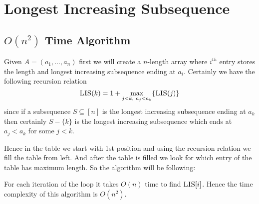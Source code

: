 \chapter{Longest Increasing Subsequence}
\begin{algoprob}
\end{algoprob}
\section{$O(n^2)$ Time Algorithm}
Given $A=(a_1,\dots, a_n)$ first we will create a $n$-length array where $i^{th}$ entry stores the length and longest increasing subsequence ending at $a_i$. Certainly we have the following recursion relation$$\textsc{LIS}(k)=1+\max\limits_{\substack{j<k,\  a_j<a_k}}\{\textsc{LIS}(j)\}$$since if a subsequence $S\subseteq [n]$ is the longest increasing subsequence ending at $a_k$ then certainly $S-\{k\}$ is the longest increasing subsequence which ends at $a_j<a_k$ for some $j<k$. 

Hence in the table we start with 1st position and using the recursion relation we fill the table from left. And after the table is filled we look for which entry of the table has maximum length. So the algorithm will be following:

\begin{algorithm}
	\DontPrintSemicolon
\caption{$(A)$}
\end{algorithm}
\pagebreak 

For each iteration of the loop it takes $O(n)$ time to find $\textsc{LIS}[i]$. Hence the time complexity of this algorithm is $O(n^2)$. 